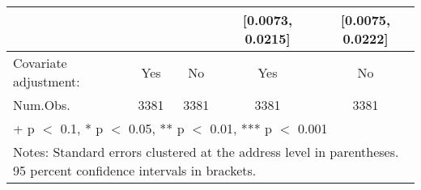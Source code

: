 \begin{table}[H]
{\begin{tabular}[t]{lcccc}
 &  &  & {}[\num{0.0073}, \num{0.0215}] & {}[\num{0.0075}, \num{0.0222}]\\
\midrule
Covariate adjustment: & Yes & No & Yes & No\\
Num.Obs. & \num{3381} & \num{3381} & \num{3381} & \num{3381}\\
\bottomrule
\multicolumn{5}{l}{\rule{0pt}{1em}+ p $<$ 0.1, * p $<$ 0.05, ** p $<$ 0.01, *** p $<$ 0.001}\\
\multicolumn{5}{l}{\rule{0pt}{1em}Notes: Standard errors clustered at the address level in parentheses. 95 percent confidence intervals in brackets.}\\
\end{tabular}}
\end{table}
